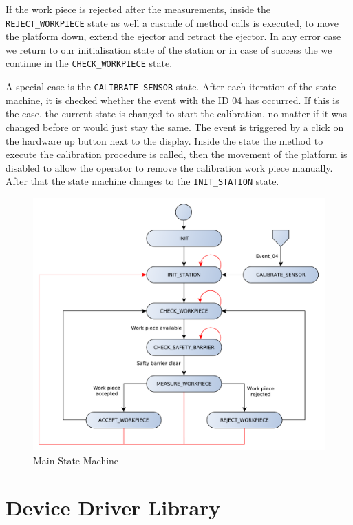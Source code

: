 If the work piece is rejected after the measurements, inside the \texttt{REJECT\_WORKPIECE} state as well a cascade of method calls is executed, to move the platform down, extend the ejector and retract the ejector. In any error case we return to our initialisation state of the station or in case of success the we continue in the \texttt{CHECK\_WORKPIECE} state.

A special case is the \texttt{CALIBRATE\_SENSOR} state. After each iteration of the state machine, it is checked whether the event with the ID 04 has occurred. If this is the case, the current state is changed to start the calibration, no matter if it was changed before or would just stay the same. The event is triggered by a click on the hardware up  button next to the display. Inside the state the method to execute the calibration procedure is called, then the movement of the platform is disabled to allow the operator to remove the calibration work piece manually. After that the state machine changes to the \texttt{INIT\_STATION} state.

\begin{figure}[H]
	\begin{center}
		\includegraphics[scale=.60]{media/StateMachine_Main.pdf} 	
		\caption{Main State Machine}
		\label{fig:statemachine}
	\end{center}
\end{figure}

\section{Device Driver Library} \label{sec:driverlibrary} %

